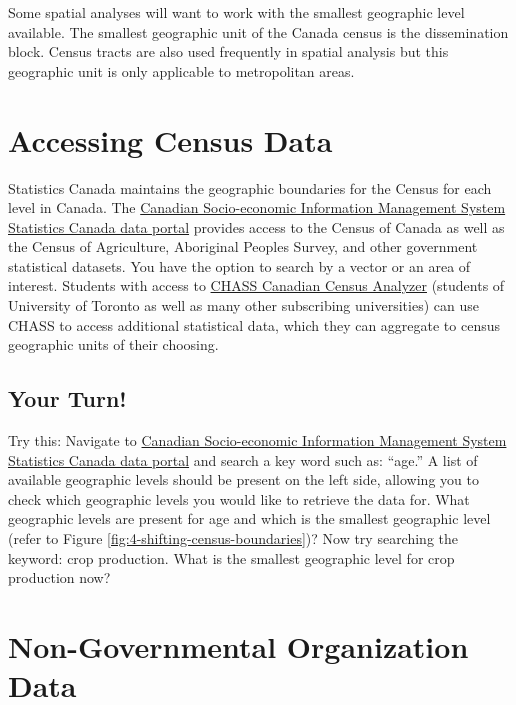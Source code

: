 \documentclass[
]{book}
\begin{document}
Some spatial analyses will want to work with the smallest geographic level available. The smallest geographic unit of the Canada census is the dissemination block. Census tracts are also used frequently in spatial analysis but this geographic unit is only applicable to metropolitan areas.

\hypertarget{accessing-census-data}{%
\section{Accessing Census Data}\label{accessing-census-data}}

Statistics Canada maintains the geographic boundaries for the Census for each level in Canada. The \href{https://www150.statcan.gc.ca/n1/en/type/data}{Canadian Socio-economic Information Management System Statistics Canada data portal} provides access to the Census of Canada as well as the Census of Agriculture, Aboriginal Peoples Survey, and other government statistical datasets. You have the option to search by a vector or an area of interest. Students with access to \href{http://dc1.chass.utoronto.ca/census/index.html}{CHASS Canadian Census Analyzer} (students of University of Toronto as well as many other subscribing universities) can use CHASS to access additional statistical data, which they can aggregate to census geographic units of their choosing.

\hypertarget{your-turn-2}{%
\subsection*{Your Turn!}\label{your-turn-2}}

Try this: Navigate to \href{https://www150.statcan.gc.ca/n1/en/type/data}{Canadian Socio-economic Information Management System Statistics Canada data portal} and search a key word such as: ``age.'' A list of available geographic levels should be present on the left side, allowing you to check which geographic levels you would like to retrieve the data for. What geographic levels are present for age and which is the smallest geographic level (refer to Figure \ref{fig:4-shifting-census-boundaries})? Now try searching the keyword: crop production. What is the smallest geographic level for crop production now?

\hypertarget{non-governmental-organization-data}{%
\section{Non-Governmental Organization Data}\label{non-governmental-organization-data}}
\end{document}
